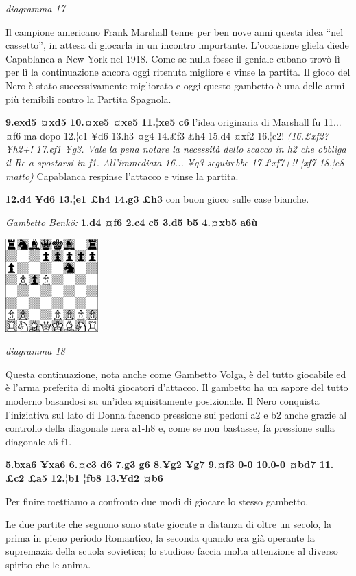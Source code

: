 \documentclass[
]{article}
\begin{document}
\emph{diagramma 17}

Il campione americano Frank Marshall tenne per ben nove anni questa idea
``nel cassetto'', in attesa di giocarla in un incontro importante.
L'occasione gliela diede Capablanca a New York nel 1918. Come se nulla
fosse il geniale cubano trovò lì per lì la continuazione ancora oggi
ritenuta migliore e vinse la partita. Il gioco del Nero è stato
successivamente migliorato e oggi questo gambetto è una delle armi più
temibili contro la Partita Spagnola.

\textbf{9.exd5 ¤xd5 10.¤xe5 ¤xe5 11.¦xe5 c6} l'idea originaria di
Marshall fu 11... ¤f6 ma dopo 12.¦e1 ¥d6 13.h3 ¤g4 14.£f3 £h4 15.d4 ¤xf2
16.¦e2! \emph{(16.£xf2? ¥h2+! 17.¢f1 ¥g3. Vale la pena notare la
necessità dello scacco in h2 che obbliga il Re a spostarsi in f1.
All'immediata 16... ¥g3 seguirebbe 17.£xf7+!! ¦xf7 18.¦e8 matto)}
Capablanca respinse l'attacco e vinse la partita.

\textbf{12.d4 ¥d6 13.¦e1 £h4 14.g3 £h3} con buon gioco sulle case
bianche.

\emph{Gambetto Benkö:} \textbf{1.d4 ¤f6 2.c4 c5 3.d5 b5 4.¤xb5 a6ù}

\includegraphics[width=1.40972in,height=1.40972in]{vertopal_109f12be458a423d8f3cc838880eaea2/media/image18.png}

\emph{diagramma 18}

Questa continuazione, nota anche come Gambetto Volga, è del tutto
giocabile ed è l'arma preferita di molti giocatori d'attacco. Il
gambetto ha un sapore del tutto moderno basandosi su un'idea
squisitamente posizionale. Il Nero conquista l'iniziativa sul lato di
Donna facendo pressione sui pedoni a2 e b2 anche grazie al controllo
della diagonale nera a1-h8 e, come se non bastasse, fa pressione sulla
diagonale a6-f1.

\textbf{5.bxa6 ¥xa6 6.¤c3 d6 7.g3 g6 8.¥g2 ¥g7 9.¤f3 0-0 10.0-0 ¤bd7
11.£c2 £a5 12.¦b1 ¦fb8 13.¥d2 ¤b6}

Per finire mettiamo a confronto due modi di giocare lo stesso gambetto.

Le due partite che seguono sono state giocate a distanza di oltre un
secolo, la prima in pieno periodo Romantico, la seconda quando era già
operante la supremazia della scuola sovietica; lo studioso faccia molta
attenzione al diverso spirito che le anima.
\end{document}
